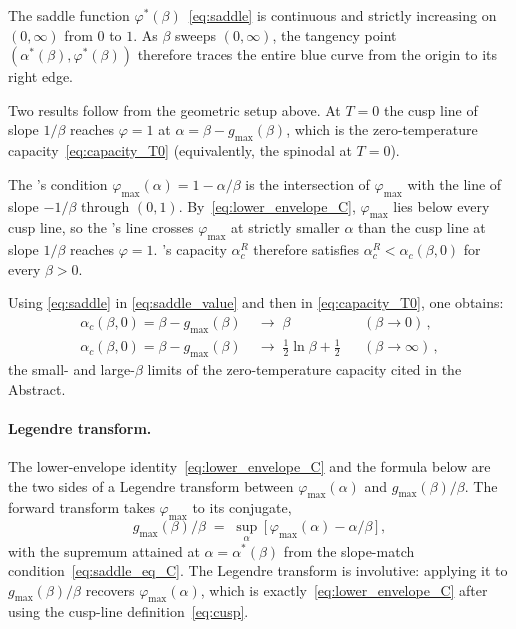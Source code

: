 \documentclass[letterpaper]{article} %
\newcommand{\Bnet}{\beta}
\newcommand{\ac}{\alpha_c}
\begin{document}
The saddle function $\varphi^*(\Bnet)$~\eqref{eq:saddle} is
continuous and strictly increasing on $(0, \infty)$ from $0$ to $1$. As $\Bnet$ sweeps $(0, \infty)$,
the tangency point $(\alpha^*(\Bnet), \varphi^*(\Bnet))$ therefore traces the
entire blue curve from the origin to its right edge.

Two results follow from the geometric setup above.  At $T = 0$ the
cusp line of slope $1/\Bnet$ reaches $\varphi = 1$ at
$\alpha = \Bnet - g_{\max}(\Bnet)$, which is the zero-temperature
capacity~\eqref{eq:capacity_T0} (equivalently, the spinodal at
$T = 0$).

The \citeauthor{ramsauer2021hopfield}'s condition
$\varphi_{\max}(\alpha) = 1 - \alpha/\Bnet$ is the intersection of
$\varphi_{\max}$ with the line of slope $-1/\Bnet$ through $(0, 1)$.
By~\eqref{eq:lower_envelope_C}, $\varphi_{\max}$ lies below every
cusp line, so the \citeauthor{ramsauer2021hopfield}'s line crosses $\varphi_{\max}$ at strictly
smaller $\alpha$ than the cusp line at slope $1/\Bnet$ reaches
$\varphi = 1$.  \citeauthor{ramsauer2021hopfield}'s capacity $\alpha_c^R$ therefore satisfies
$\alpha_c^R < \alpha_c(\Bnet, 0)$ for every $\Bnet > 0$.

Using \eqref{eq:saddle} in
\eqref{eq:saddle_value} and then in \eqref{eq:capacity_T0}, one obtains:
\begin{equation}
\begin{aligned}
\ac(\Bnet, 0) = \Bnet - g_{\max}(\Bnet) &\;\to\; \Bnet
   && (\Bnet \to 0)\,,\\
\ac(\Bnet, 0) = \Bnet - g_{\max}(\Bnet) &\;\to\; \tfrac{1}{2}\ln\Bnet + \tfrac{1}{2}
   && (\Bnet \to \infty)\,,
\end{aligned}
\label{eq:asymptotic_C}
\end{equation}
the small- and large-$\Bnet$ limits of the zero-temperature capacity
cited in the Abstract.

\paragraph{Legendre transform.}
The lower-envelope identity~\eqref{eq:lower_envelope_C} and the formula
below are the two sides of a Legendre transform between
$\varphi_{\max}(\alpha)$ and $g_{\max}(\Bnet)/\Bnet$.  The forward
transform takes $\varphi_{\max}$ to its conjugate,
\begin{equation}
g_{\max}(\Bnet)/\Bnet \;=\; \sup_\alpha\,\bigl[\,\varphi_{\max}(\alpha) - \alpha/\Bnet\,\bigr]\,,
\label{eq:legendre_C}
\end{equation}
with the supremum attained at $\alpha = \alpha^*(\Bnet)$ from the
slope-match condition~\eqref{eq:saddle_eq_C}.  The Legendre transform
is involutive: applying it to $g_{\max}(\Bnet)/\Bnet$ recovers
$\varphi_{\max}(\alpha)$, which is exactly~\eqref{eq:lower_envelope_C}
after using the cusp-line definition~\eqref{eq:cusp}.
\end{document}
